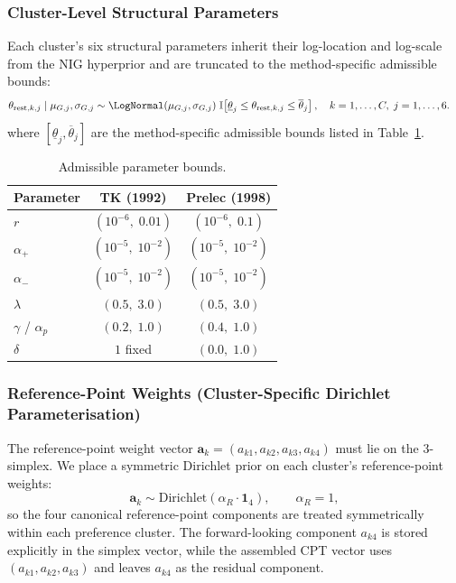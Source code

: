 \documentclass[12pt, a4paper]{article}
\newcommand{\Dir}{\mathrm{Dirichlet}}
\newcommand{\ba}{\mathbf{a}}
\begin{document}
\subsubsection{Cluster-Level Structural Parameters}

Each cluster's six structural parameters inherit their log-location and
log-scale from the NIG hyperprior and are truncated to the method-specific
admissible bounds:
\begin{align}
  \theta_{\mathrm{rest},k,j} \mid \mu_{G,j}, \sigma_{G,j}
    &\sim \LogNormal(\mu_{G,j}, \sigma_{G,j})
       \; \mathbb{I}\!\left[
       \underline{\theta}_j \leq \theta_{\mathrm{rest},k,j}
       \leq \overline{\theta}_j
       \right],
  \quad k = 1, \ldots, C,\; j = 1, \ldots, 6.
  \label{eq:prior_theta_rest}
\end{align}
where $[\underline{\theta}_j, \overline{\theta}_j]$ are the method-specific
admissible bounds listed in Table~\ref{tab:bounds}.

\begin{table}[h!]
  \centering
  \caption{Admissible parameter bounds.}
  \label{tab:bounds}
  \begin{tabular}{lcc}
    \toprule
    Parameter & TK (1992) & Prelec (1998) \\
    \midrule
    $r$           & $(10^{-6},\; 0.01)$  & $(10^{-6},\; 0.1)$ \\
    $\alpha_+$    & $(10^{-5},\; 10^{-2})$ & $(10^{-5},\; 10^{-2})$ \\
    $\alpha_-$    & $(10^{-5},\; 10^{-2})$ & $(10^{-5},\; 10^{-2})$ \\
    $\lambda$     & $(0.5,\; 3.0)$       & $(0.5,\; 3.0)$     \\
    $\gamma$ / $\alpha_p$
                  & $(0.2,\; 1.0)$       & $(0.4,\; 1.0)$     \\
    $\delta$      & $1$ fixed            & $(0.0,\; 1.0)$     \\
    \bottomrule
  \end{tabular}
\end{table}

\subsubsection{Reference-Point Weights (Cluster-Specific Dirichlet Parameterisation)}

The reference-point weight vector $\ba_k = (a_{k1}, a_{k2}, a_{k3}, a_{k4})$
must lie on the 3-simplex.  We place a symmetric Dirichlet prior on each
cluster's reference-point weights:
\begin{equation}
  \ba_k \sim \Dir\!\left(\alpha_R \cdot \mathbf{1}_4\right),
  \qquad \alpha_R = 1,
  \label{eq:prior_a}
\end{equation}
so the four canonical reference-point components are treated symmetrically
within each preference cluster.  The forward-looking component $a_{k4}$ is stored
explicitly in the simplex vector, while the assembled CPT vector uses
$(a_{k1}, a_{k2}, a_{k3})$ and leaves $a_{k4}$ as the residual component.
\end{document}
